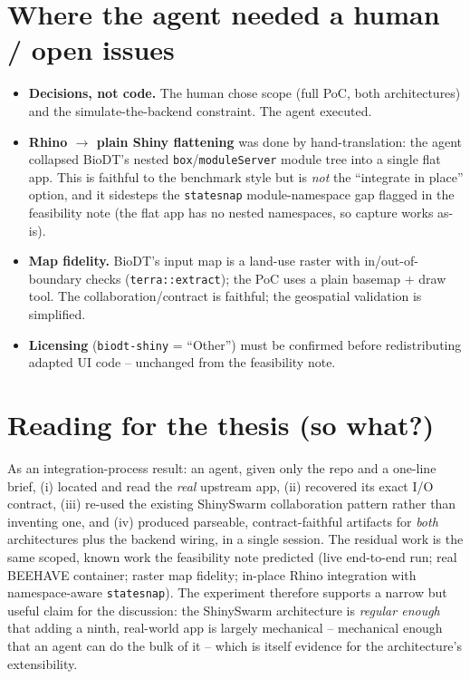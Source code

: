\documentclass[12pt,a4paper]{article}
\begin{document}
\section{Where the agent needed a human / open issues}

\begin{itemize}[nosep]
  \item \textbf{Decisions, not code.} The human chose scope (full PoC, both
    architectures) and the simulate-the-backend constraint. The agent executed.
  \item \textbf{Rhino $\to$ plain Shiny flattening} was done by hand-translation:
    the agent collapsed BioDT's nested \texttt{box}/\texttt{moduleServer} module
    tree into a single flat app. This is faithful to the benchmark style but is
    \emph{not} the ``integrate in place'' option, and it sidesteps the
    \texttt{statesnap} module-namespace gap flagged in the feasibility note (the
    flat app has no nested namespaces, so capture works as-is).
  \item \textbf{Map fidelity.} BioDT's input map is a land-use raster with
    in/out-of-boundary checks (\texttt{terra::extract}); the PoC uses a plain
    basemap + draw tool. The collaboration/contract is faithful; the
    geospatial validation is simplified.
  \item \textbf{Licensing} (\texttt{biodt-shiny} = ``Other'') must be confirmed
    before redistributing adapted UI code -- unchanged from the feasibility note.
\end{itemize}

\section{Reading for the thesis (so what?)}

As an integration-process result: an agent, given only the repo and a one-line
brief, (i) located and read the \emph{real} upstream app, (ii) recovered its
exact I/O contract, (iii) re-used the existing ShinySwarm collaboration pattern
rather than inventing one, and (iv) produced parseable, contract-faithful
artifacts for \emph{both} architectures plus the backend wiring, in a single
session. The residual work is the same scoped, known work the feasibility note
predicted (live end-to-end run; real BEEHAVE container; raster map fidelity;
in-place Rhino integration with namespace-aware \texttt{statesnap}). The
experiment therefore supports a narrow but useful claim for the discussion: the
ShinySwarm architecture is \emph{regular enough} that adding a ninth, real-world
app is largely mechanical -- mechanical enough that an agent can do the bulk of
it -- which is itself evidence for the architecture's extensibility.
\end{document}

